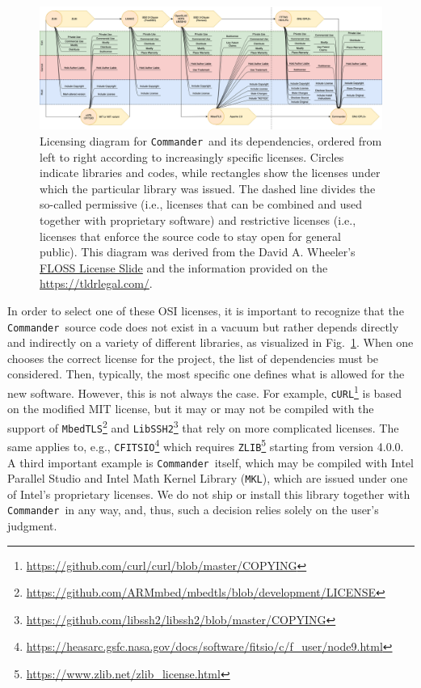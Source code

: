 \documentclass[twocolumn]{aa}
\def\commander{\texttt{Commander}}
\begin{document}
\begin{figure}[t]
    \center
    \includegraphics[width=\linewidth]{figures/Commander_Licenses_Diagram_v5.png}
    \caption{Licensing diagram
      for \commander\ and its dependencies,
      ordered from left to right according to increasingly specific
      licenses. Circles indicate libraries and codes, while rectangles
      show the licenses under which the particular library was
      issued. The dashed line divides the so-called permissive (i.e.,
      licenses that can be combined and used together with proprietary
      software) and restrictive licenses (i.e., licenses that enforce
      the source code to stay open for general public). This diagram 
      was derived from the David A. Wheeler's 
      \href{https://dwheeler.com/essays/floss-license-slide.html}{FLOSS License Slide}
      and the information provided on the \url{https://tldrlegal.com/}.} 
    \label{fig:licensing_diagram}
\end{figure}

In order to select one of these OSI licenses, it is important to recognize that the \commander\ source code does not exist in a vacuum but rather depends directly and indirectly on a variety of different libraries, as visualized in Fig.~\ref{fig:licensing_diagram}. When one chooses the correct license for the project, the list of dependencies must be considered. Then, typically, the most specific one defines what is allowed for the new software. However, this is not always the case. For example, \texttt{cURL}\footnote{
  \url{https://github.com/curl/curl/blob/master/COPYING}} is based on the modified MIT license, but it may or may not be compiled with the support of \texttt{MbedTLS}\footnote{
  \url{https://github.com/ARMmbed/mbedtls/blob/development/LICENSE}}
and \texttt{LibSSH2}\footnote{
  \url{https://github.com/libssh2/libssh2/blob/master/COPYING}} that
rely on more complicated licenses. The same applies to, e.g.,
\texttt{CFITSIO}\footnote{\url{https://heasarc.gsfc.nasa.gov/docs/software/fitsio/c/f_user/node9.html}} which requires \texttt{ZLIB}\footnote{\url{https://www.zlib.net/zlib_license.html}} starting from version 4.0.0. A third important example is \commander\ itself, which may be compiled with Intel Parallel Studio and Intel Math Kernel Library (\texttt{MKL}), which are issued under one of Intel's proprietary licenses. We do not ship or install this library together with \commander\ in any way, and, thus, such a decision relies solely on the user's judgment.
\end{document}
